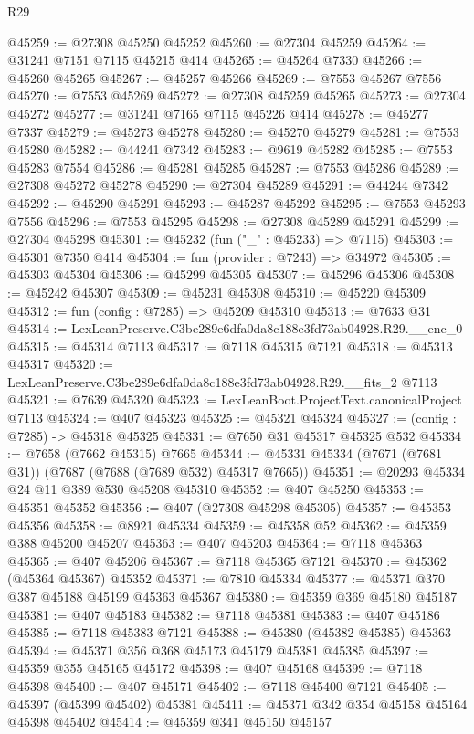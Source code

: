 \begin{lexlean}{R29}
\begin{coremodule}
@45259 := @27308 @45250 @45252
@45260 := @27304 @45259
@45264 := @31241 @7151 @7115 @45215 @414
@45265 := @45264 @7330
@45266 := @45260 @45265
@45267 := @45257 @45266
@45269 := @7553 @45267 @7556
@45270 := @7553 @45269
@45272 := @27308 @45259 @45265
@45273 := @27304 @45272
@45277 := @31241 @7165 @7115 @45226 @414
@45278 := @45277 @7337
@45279 := @45273 @45278
@45280 := @45270 @45279
@45281 := @7553 @45280
@45282 := @44241 @7342
@45283 := @9619 @45282
@45285 := @7553 @45283 @7554
@45286 := @45281 @45285
@45287 := @7553 @45286
@45289 := @27308 @45272 @45278
@45290 := @27304 @45289
@45291 := @44244 @7342
@45292 := @45290 @45291
@45293 := @45287 @45292
@45295 := @7553 @45293 @7556
@45296 := @7553 @45295
@45298 := @27308 @45289 @45291
@45299 := @27304 @45298
@45301 := @45232 (fun ("_" : @45233) => @7115)
@45303 := @45301 @7350 @414
@45304 := fun (provider : @7243) => @34972
@45305 := @45303 @45304
@45306 := @45299 @45305
@45307 := @45296 @45306
@45308 := @45242 @45307
@45309 := @45231 @45308
@45310 := @45220 @45309
@45312 := fun (config : @7285) => @45209 @45310
@45313 := @7633 @31
@45314 := LexLeanPreserve.C3be289e6dfa0da8c188e3fd73ab04928.R29.__enc_0
@45315 := @45314 @7113
@45317 := @7118 @45315 @7121
@45318 := @45313 @45317
@45320 := LexLeanPreserve.C3be289e6dfa0da8c188e3fd73ab04928.R29.__fits_2 @7113
@45321 := @7639 @45320
@45323 := LexLeanBoot.ProjectText.canonicalProject @7113
@45324 := @407 @45323
@45325 := @45321 @45324
@45327 := (config : @7285) -> @45318 @45325
@45331 := @7650 @31 @45317 @45325 @532
@45334 := @7658 (@7662 @45315) @7665
@45344 := @45331 @45334 (@7671 (@7681 @31)) (@7687 (@7688 (@7689 @532) @45317 @7665))
@45351 := @20293 @45334 @24 @11 @389 @530 @45208 @45310
@45352 := @407 @45250
@45353 := @45351 @45352
@45356 := @407 (@27308 @45298 @45305)
@45357 := @45353 @45356
@45358 := @8921 @45334
@45359 := @45358 @52
@45362 := @45359 @388 @45200 @45207
@45363 := @407 @45203
@45364 := @7118 @45363
@45365 := @407 @45206
@45367 := @7118 @45365 @7121
@45370 := @45362 (@45364 @45367) @45352
@45371 := @7810 @45334
@45377 := @45371 @370 @387 @45188 @45199 @45363 @45367
@45380 := @45359 @369 @45180 @45187
@45381 := @407 @45183
@45382 := @7118 @45381
@45383 := @407 @45186
@45385 := @7118 @45383 @7121
@45388 := @45380 (@45382 @45385) @45363
@45394 := @45371 @356 @368 @45173 @45179 @45381 @45385
@45397 := @45359 @355 @45165 @45172
@45398 := @407 @45168
@45399 := @7118 @45398
@45400 := @407 @45171
@45402 := @7118 @45400 @7121
@45405 := @45397 (@45399 @45402) @45381
@45411 := @45371 @342 @354 @45158 @45164 @45398 @45402
@45414 := @45359 @341 @45150 @45157

\end{coremodule}
\end{lexlean}
